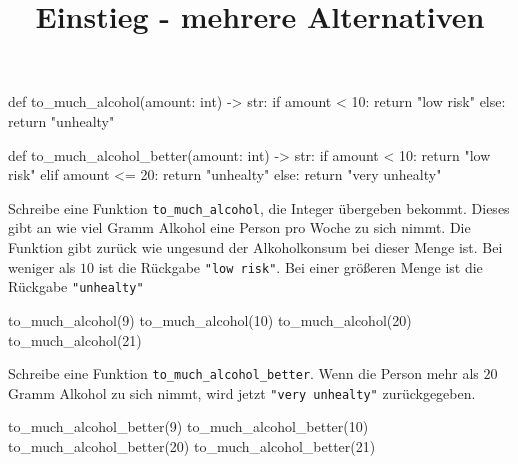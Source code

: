 \documentclass[a4paper, fontsize = 13, DIV = calc]{scrartcl}
\title{Einstieg - mehrere Alternativen}
\date{}
\newcommand{\expandpyconc}[1]{\expandafter\reallyexpandpyconc\expandafter{#1}}
\newcommand{\reallyexpandpyconc}[1]{\pyconc{exec(compile(open('#1', 'rb').read(), '#1', 'exec'))}}
\newenvironment{pyconcodeblck}[1]
{\newcommand{\snippetfile}{snippet-#1.py}
	\VerbatimEnvironment
	\begin{VerbatimOut}{\snippetfile}}
	{\end{VerbatimOut}
	\expandpyconc{\snippetfile}}
\begin{document}
\begin{pyconcodeblck}{temp}
def to_much_alcohol(amount: int) -> str:
    if amount < 10:
        return "low risk"
    else:
        return "unhealty"
	
def to_much_alcohol_better(amount: int) -> str:
    if amount < 10:
		return "low risk"
    elif amount <= 20:
		return "unhealty"
    else:
		return "very unhealty"
\end{pyconcodeblck}


\begin{aufgabe} \noindent 
Schreibe eine Funktion \texttt{to_much_alcohol}, die Integer übergeben bekommt. Dieses gibt an wie viel Gramm Alkohol eine Person pro Woche zu sich nimmt. Die Funktion gibt zurück wie ungesund der Alkoholkonsum bei dieser Menge ist. Bei weniger  als $10$ ist die Rückgabe \texttt{"low risk"}. Bei einer größeren Menge ist die Rückgabe \texttt{"unhealty"}
\end{aufgabe}
\begin{pyconsole}
to_much_alcohol(9)
to_much_alcohol(10)
to_much_alcohol(20)
to_much_alcohol(21)
\end{pyconsole}


%



\begin{aufgabe}\noindent 
Schreibe eine Funktion \texttt{to_much_alcohol_better}. Wenn die Person mehr als $20$ Gramm Alkohol zu sich nimmt, wird jetzt \texttt{"very unhealty"} zurückgegeben.
\end{aufgabe}
\begin{pyconsole}
to_much_alcohol_better(9)
to_much_alcohol_better(10)
to_much_alcohol_better(20)
to_much_alcohol_better(21)
\end{pyconsole}






%
\end{document}
